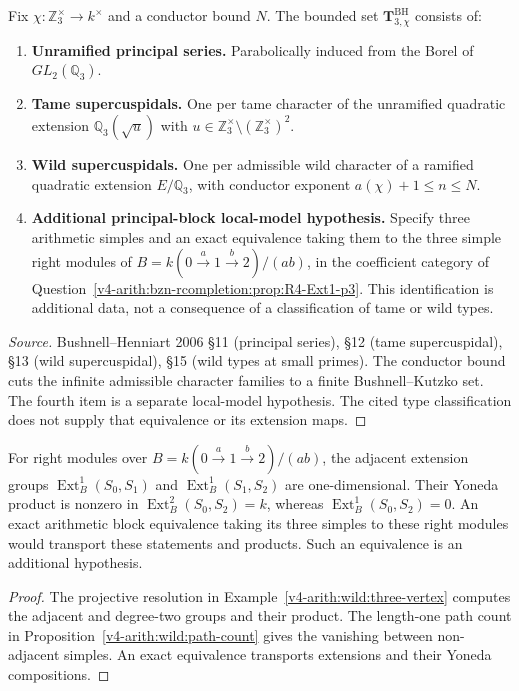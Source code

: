 \begin{proposition}[Bushnell--Henniart 2006 classification at \(p=3\)]
\label{v4-arith:f1a3-BH:prop:BH-types-p3}
Fix
\(\chi\colon\mathbb{Z}_{3}^{\times}\to k^{\times}\) and a conductor
bound \(N\). The bounded set \(\mathbf{T}^{\mathrm{BH}}_{3,\chi}\)
consists of:
\begin{enumerate}
\item \textbf{Unramified principal series.} Parabolically induced
from the Borel of \(GL_{2}(\mathbb{Q}_{3})\).
\item \textbf{Tame supercuspidals.} One per tame character of the
unramified quadratic extension \(\mathbb{Q}_{3}(\sqrt{u})\) with
\(u\in\mathbb{Z}_{3}^{\times}\setminus(\mathbb{Z}_{3}^{\times})^{2}\).
\item \textbf{Wild supercuspidals.} One per admissible wild character
of a ramified quadratic extension \(E/\mathbb{Q}_{3}\), with conductor
exponent \(a(\chi)+1\leq n\leq N\).
\item \textbf{Additional principal-block local-model hypothesis.}
Specify three arithmetic simples and an exact equivalence taking them
to the three simple right modules of
\(B=k(0\xrightarrow{a}1\xrightarrow{b}2)/(ab)\), in the coefficient category of
Question~\ref{v4-arith:bzn-rcompletion:prop:R4-Ext1-p3}.
This identification is additional data, not a consequence of a
classification of tame or wild types.
\end{enumerate}
\end{proposition}

\begin{proof}[Source]
Bushnell--Henniart 2006 \S 11 (principal series), \S 12 (tame
supercuspidal), \S 13 (wild supercuspidal), \S 15 (wild types at
small primes). The conductor bound cuts the infinite admissible
character families to a finite Bushnell--Kutzko set.
The fourth item is a separate local-model hypothesis. The cited type
classification does not supply that equivalence or its extension maps.
\end{proof}

\begin{proposition}
\label{v4-arith:f1a3-BH:prop:A2-quiver-p3}
For right modules over
\(B=k(0\xrightarrow a1\xrightarrow b2)/(ab)\), the adjacent
extension groups \(\operatorname{Ext}^1_B(S_0,S_1)\) and
\(\operatorname{Ext}^1_B(S_1,S_2)\) are one-dimensional. Their
Yoneda product is nonzero in \(\operatorname{Ext}^2_B(S_0,S_2)=k\),
whereas \(\operatorname{Ext}^1_B(S_0,S_2)=0\).
An exact arithmetic block equivalence taking its three simples to
these right modules would transport these statements and products.
Such an equivalence is an additional hypothesis.
\end{proposition}
\begin{proof}
The projective resolution in
Example~\ref{v4-arith:wild:three-vertex} computes the adjacent and
degree-two groups and their product. The length-one path count
in Proposition~\ref{v4-arith:wild:path-count} gives the vanishing
between non-adjacent simples. An exact equivalence transports
extensions and their Yoneda compositions.
\end{proof}

